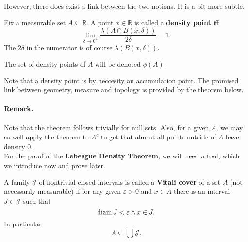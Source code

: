 However, there does exist a link between the two notions. It is a bit more subtle.

\begin{defn}
    Fix a measurable set \( A \subseteq \mathbb{R} \). A point \( x \in \mathbb{R} \) is called a \textbf{density point} iff
    \[ 
        \lim_{\delta \to 0^+} \frac{\lambda(A \cap B(x, \delta))}{2\delta} = 1.
   \]
   The \( 2\delta \) in the numerator is of course \( \lambda(B(x, \delta)) \).
\end{defn}
\begin{defn}
    The set of density points of \( A \) will be denoted \( \phi(A) \).
\end{defn}


Note that a density point is by neccesity an accumulation point. The promised link between geometry, measure and topology is provided by the theorem below.

\paragraph{Remark.} Note that the theorem follows trivially for null sets. Also, for a given \( A \), we may as well apply the theorem to \( A^c \) to get that almost all points outside of \( A \) have density \( 0 \).
\\

For the proof of the \textbf{Lebesgue Density Theorem}, we will need a tool, which we introduce now and prove later.
\begin{defn}
    A family \(\mathcal{J} \) of nontrivial closed intervals is called a \textbf{Vitali cover} of a set \( A \) (not necessarily measurable) if for any given \(\varepsilon > 0 \) and \( x \in A \) there is an interval \( J \in \mathcal{J} \) such that
    \[ 
       \operatorname{diam} J <\varepsilon \wedge x \in J.
   \]
   In particular
   \[ 
      A \subseteq \bigcup \mathcal{J}.
  \]
\end{defn}

